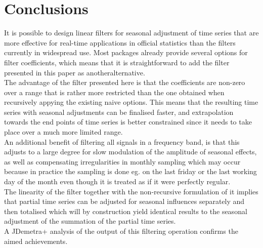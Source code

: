 \documentclass{article}
\begin{document}
\section*{Conclusions}
It is possible to design linear filters for seasonal adjustment of time series that are more effective for real-time applications in official statistics than the filters currently in widespread use. Most packages already provide several options for filter coefficients, which means that it is straightforward to add the filter presented in this paper as anotheralternative.\\The advantage of the filter presented here is that the coefficients are non-zero over a range that is rather more restricted than the one obtained when recursively appying the existing naive options. This means that the resulting time series with seasonal adjustments can be finalised faster, and extrapolation towards the end points of time series is better constrained since it needs to take place over a much more limited range.\\An additional benefit of filtering all signals in a frequency band, is that this adjusts to a large degree for slow modulation of the amplitude of seasonal effects, as well as compensating irregularities in monthly sampling which may occur because in practice the sampling is done eg. on the last friday or the last working day of the month even though it is treated as if it were perfectly regular.\\The linearity of the filter together with the non-recursive formulation of it implies that partial time series can be adjusted for seasonal influences separately and then totalised which will by construction yield identical results to the seasonal adjustment of the summation of the partial time series.\\A JDemetra+ analysis of the output of this filtering operation confirms the aimed achievements.
\end{document}
